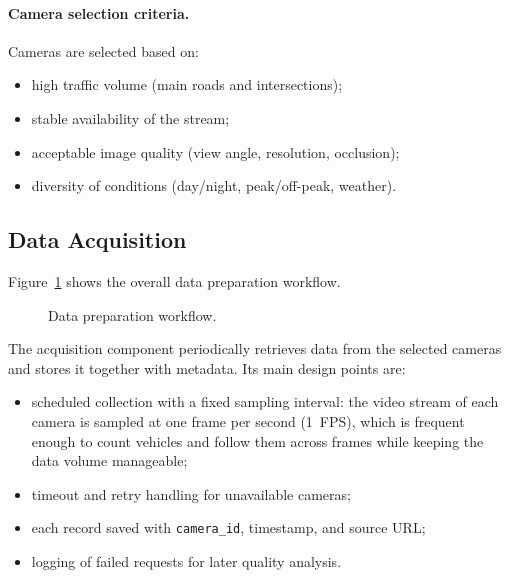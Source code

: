 \documentclass[12pt,a4paper]{article}
\begin{document}
\paragraph{Camera selection criteria.}
Cameras are selected based on:
\begin{itemize}
  \item high traffic volume (main roads and intersections);
  \item stable availability of the stream;
  \item acceptable image quality (view angle, resolution, occlusion);
  \item diversity of conditions (day/night, peak/off-peak, weather).
\end{itemize}

\subsection{Data Acquisition}
\label{subsec:acquisition}
Figure~\ref{fig:prep-flow} shows the overall data preparation workflow.

\begin{figure}[H]
\centering
{}
\caption{Data preparation workflow.}
\label{fig:prep-flow}
\end{figure}

The acquisition component periodically retrieves data from the selected
cameras and stores it together with metadata. Its main design points are:
\begin{itemize}
  \item scheduled collection with a fixed sampling interval: the video stream
        of each camera is sampled at one frame per second (1~FPS), which is
        frequent enough to count vehicles and follow them across frames while
        keeping the data volume manageable;
  \item timeout and retry handling for unavailable cameras;
  \item each record saved with \texttt{camera\_id}, timestamp, and source URL;
  \item logging of failed requests for later quality analysis.
\end{itemize}
\end{document}
